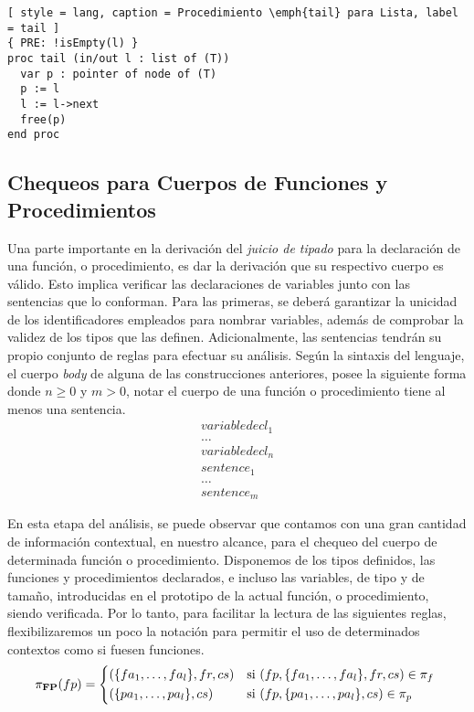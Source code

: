 \begin{lstlisting}[ style = lang, caption = Procedimiento \emph{tail} para Lista, label = tail ]
{ PRE: !isEmpty(l) }
proc tail (in/out l : list of (T))
  var p : pointer of node of (T)
  p := l
  l := l->next
  free(p)
end proc
\end{lstlisting}

\subsection{Chequeos para Cuerpos de Funciones y Procedimientos}

Una parte importante en la derivación del \textit{juicio de tipado} para la declaración de una función, o procedimiento, es dar la derivación que su respectivo cuerpo es válido.
Esto implica verificar las declaraciones de variables junto con las sentencias que lo conforman.
Para las primeras, se deberá garantizar la unicidad de los identificadores empleados para nombrar variables, además de comprobar la validez de los tipos que las definen.
Adicionalmente, las sentencias tendrán su propio conjunto de reglas para efectuar su análisis.
Según la sintaxis del lenguaje, el cuerpo \textit{body} de alguna de las construcciones anteriores, posee la siguiente forma donde $n \geq 0$ y $m > 0$, notar el cuerpo de una función o procedimiento tiene al menos una sentencia.
\begin{gather*}
variabledecl_1
\\
\ldots
\\
variabledecl_n
\\
sentence_1
\\
\ldots
\\
sentence_m
\end{gather*}

En esta etapa del análisis, se puede observar que contamos con una gran cantidad de información contextual, en nuestro alcance, para el chequeo del cuerpo de determinada función o procedimiento.
Disponemos de los tipos definidos, las funciones y procedimientos declarados, e incluso las variables, de tipo y de tamaño, introducidas en el prototipo de la actual función, o procedimiento, siendo verificada.
Por lo tanto, para facilitar la lectura de las siguientes reglas, flexibilizaremos un poco la notación para permitir el uso de determinados contextos como si fuesen funciones.
\begin{align*}
\PI{FP}(fp) =
\begin{cases*}
(\{ fa_1, \ldots, fa_l \}, fr, cs )
&
si $(fp, \{ fa_1, \ldots, fa_l \}, fr, cs ) \in \pi_{f}$
\\
(\{ pa_1, \ldots, pa_l \}, cs )
&
si $(fp, \{ pa_1, \ldots, pa_l \}, cs ) \in \pi_{p}$
\end{cases*}
\end{align*}

